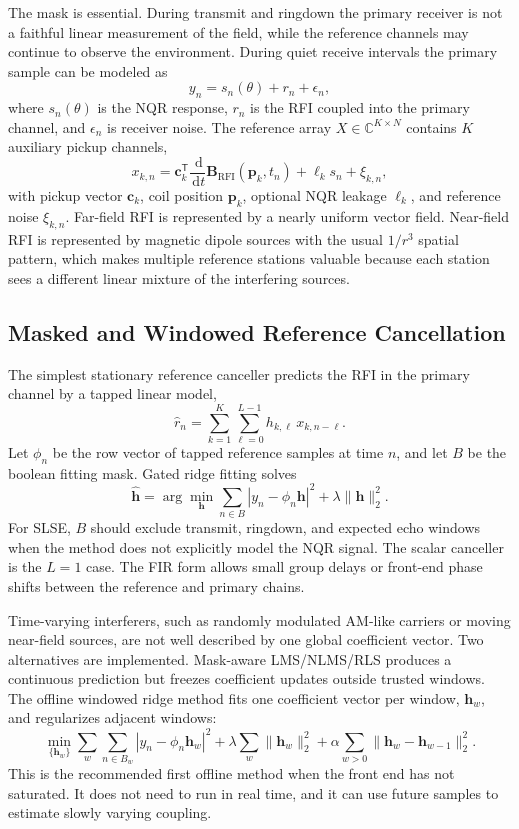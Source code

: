 \documentclass[11pt,oneside]{report}
\newcommand{\dd}{\,\mathrm{d}}
\begin{document}
The mask is essential. During transmit and ringdown the primary receiver is not
a faithful linear measurement of the field, while the reference channels may
continue to observe the environment. During quiet receive intervals the primary
sample can be modeled as
\[
  y_n = s_n(\theta) + r_n + \epsilon_n,
\]
where \(s_n(\theta)\) is the NQR response, \(r_n\) is the RFI coupled into the
primary channel, and \(\epsilon_n\) is receiver noise. The reference array
\(X\in\mathbb{C}^{K\times N}\) contains \(K\) auxiliary pickup channels,
\[
  x_{k,n} =
  \mathbf{c}_k^{\mathsf T}
  \frac{\dd}{\dd t}\mathbf{B}_{\mathrm{RFI}}(\mathbf{p}_k,t_n)
  + \ell_k s_n + \xi_{k,n},
\]
with pickup vector \(\mathbf{c}_k\), coil position \(\mathbf{p}_k\), optional
NQR leakage \(\ell_k\), and reference noise \(\xi_{k,n}\). Far-field RFI is
represented by a nearly uniform vector field. Near-field RFI is represented by
magnetic dipole sources with the usual \(1/r^3\) spatial pattern, which makes
multiple reference stations valuable because each station sees a different
linear mixture of the interfering sources.

\subsection{Masked and Windowed Reference Cancellation}

The simplest stationary reference canceller predicts the RFI in the primary
channel by a tapped linear model,
\[
  \widehat{r}_n =
  \sum_{k=1}^{K}\sum_{\ell=0}^{L-1} h_{k,\ell}\,x_{k,n-\ell}.
\]
Let \(\phi_n\) be the row vector of tapped reference samples at time \(n\), and
let \(B\) be the boolean fitting mask. Gated ridge fitting solves
\[
  \widehat{\mathbf{h}}
  =
  \arg\min_{\mathbf{h}}
  \sum_{n\in B}|y_n-\phi_n\mathbf{h}|^2
  + \lambda\|\mathbf{h}\|_2^2.
\]
For SLSE, \(B\) should exclude transmit, ringdown, and expected echo windows
when the method does not explicitly model the NQR signal. The scalar canceller
is the \(L=1\) case. The FIR form allows small group delays or front-end phase
shifts between the reference and primary chains.

Time-varying interferers, such as randomly modulated AM-like carriers or moving
near-field sources, are not well described by one global coefficient vector.
Two alternatives are implemented. Mask-aware LMS/NLMS/RLS produces a continuous
prediction but freezes coefficient updates outside trusted windows. The offline
windowed ridge method fits one coefficient vector per window,
\(\mathbf{h}_w\), and regularizes adjacent windows:
\[
  \min_{\{\mathbf{h}_w\}}
  \sum_w\sum_{n\in B_w}|y_n-\phi_n\mathbf{h}_w|^2
  + \lambda\sum_w\|\mathbf{h}_w\|_2^2
  + \alpha\sum_{w>0}\|\mathbf{h}_w-\mathbf{h}_{w-1}\|_2^2.
\]
This is the recommended first offline method when the front end has not
saturated. It does not need to run in real time, and it can use future samples
to estimate slowly varying coupling.
\end{document}
